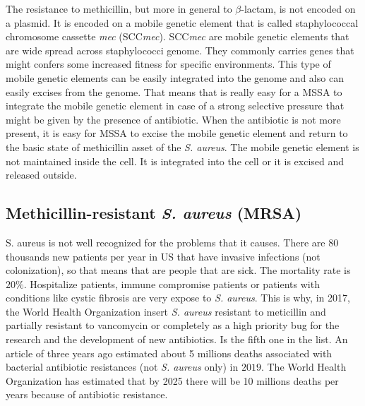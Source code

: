 The resistance to methicillin, but more in general to $\beta$-lactam, is not encoded on a plasmid. It is encoded on a mobile genetic element that is called staphylococcal chromosome cassette \emph{mec} (SCC\emph{mec}). SCC\emph{mec} are mobile genetic elements that are wide spread across staphylococci genome. They commonly carries genes that might confers some increased fitness for specific environments. This type of mobile genetic elements can be easily integrated into the genome and also can easily excises from the genome. That means that is really easy for a MSSA to integrate the mobile genetic element in case of a strong selective pressure that might be given by the presence of antibiotic. When the antibiotic is not more present, it is easy for MSSA to excise the mobile genetic element and return to the basic state of methicillin asset of the \emph{S. aureus}. 
The mobile genetic element is not maintained inside the cell. It is integrated into the cell or it is excised and released outside.

\subsection{Methicillin-resistant \emph{S. aureus} (MRSA)}
S. aureus is not well recognized for the problems that it causes. There are 80 thousands new patients per year in US that have invasive infections (not colonization), so that means that are people that are sick. The mortality rate is $20\%$. 
    Hospitalize patients, immune compromise patients or patients with conditions like cystic fibrosis are very expose to \emph{S. aureus}. This is why, in 2017, the World Health Organization insert \emph{S. aureus} resistant to meticillin and partially resistant to vancomycin or completely as a high priority bug for the research and the development of new antibiotics. Is the fifth one in the list.
An article of three years ago estimated about 5 millions deaths associated with bacterial antibiotic resistances (not \emph{S. aureus} only) in $2019$. The World Health Organization has estimated that by 2025 there will be 10 millions deaths per years because of antibiotic resistance. 

